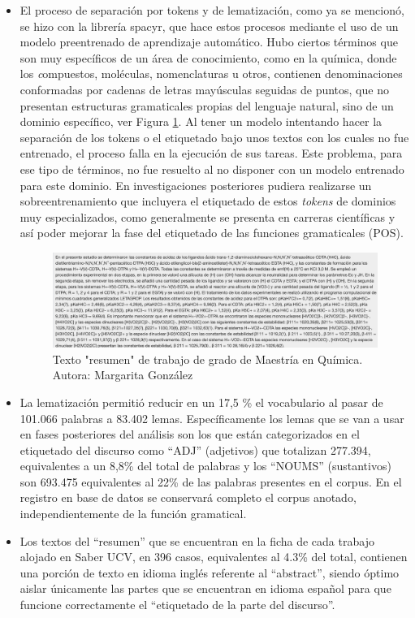 \documentclass[
  12pt,
  openany]{book}
\begin{document}
\begin{itemize}
\item
  El proceso de separación por tokens y de lematización, como ya se mencionó, se hizo con la librería spacyr, que hace estos procesos mediante el uso de un modelo preentrenado de aprendizaje automático. Hubo ciertos términos que son muy específicos de un área de conocimiento, como en la química, donde los \emph{c}ompuestos, moléculas, nomenclaturas u otros, contienen denominaciones conformadas por cadenas de letras mayúsculas seguidas de puntos, que no presentan estructuras gramaticales propias del lenguaje natural, sino de un dominio específico, ver Figura \ref{fig:quimica}. Al tener un modelo intentando hacer la separación de los tokens o el etiquetado bajo unos textos con los cuales no fue entrenado, el proceso falla en la ejecución de sus tareas. Este problema, para ese tipo de términos, no fue resuelto al no disponer con un modelo entrenado para este dominio. En investigaciones posteriores pudiera realizarse un sobreentrenamiento que incluyera el etiquetado de estos \emph{tokens} de dominios muy especializados, como generalmente se presenta en carreras científicas y así poder mejorar la fase del etiquetado de las funciones gramaticales (POS).

  \begin{figure}

  {\centering \includegraphics[width=0.9\linewidth]{images/05-desarrollo/2_ciclo/quimica} 

  }

  \caption{Texto "resumen" de trabajo de grado de Maestría en Química. Autora: Margarita González}\label{fig:quimica}
  \end{figure}
\item
  La lematización permitió reducir en un 17,5 \% el vocabulario al pasar de 101.066 palabras a 83.402 lemas. Específicamente los lemas que se van a usar en fases posteriores del análisis son los que están categorizados en el etiquetado del discurso como ``ADJ'' (adjetivos) que totalizan 277.394, equivalentes a un 8,8\% del total de palabras y los ``NOUMS'' (sustantivos) son 693.475 equivalentes al 22\% de las palabras presentes en el corpus. En el registro en base de datos se conservará completo el corpus anotado, independientemente de la función gramatical.
\item
  Los textos del ``resumen'' que se encuentran en la ficha de cada trabajo alojado en Saber UCV, en 396 casos, equivalentes al 4.3\% del total, contienen una porción de texto en idioma inglés referente al ``abstract'', siendo óptimo aislar únicamente las partes que se encuentran en idioma español para que funcione correctamente el ``etiquetado de la parte del discurso''.
\end{itemize}
\end{document}
